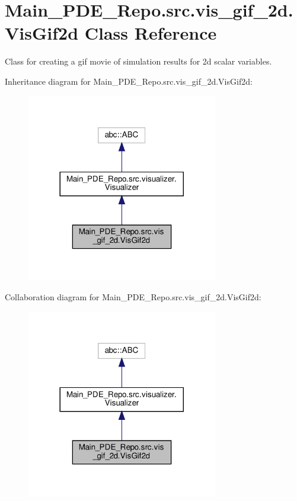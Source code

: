 \hypertarget{classMain__PDE__Repo_1_1src_1_1vis__gif__2d_1_1VisGif2d}{}\section{Main\+\_\+\+P\+D\+E\+\_\+\+Repo.\+src.\+vis\+\_\+gif\+\_\+2d.\+Vis\+Gif2d Class Reference}
\label{classMain__PDE__Repo_1_1src_1_1vis__gif__2d_1_1VisGif2d}


Class for creating a gif movie of simulation results for 2d scalar variables.  




Inheritance diagram for Main\+\_\+\+P\+D\+E\+\_\+\+Repo.\+src.\+vis\+\_\+gif\+\_\+2d.\+Vis\+Gif2d\+:
\nopagebreak
\begin{figure}[H]
\begin{center}
\leavevmode
\includegraphics[width=236pt]{classMain__PDE__Repo_1_1src_1_1vis__gif__2d_1_1VisGif2d__inherit__graph}
\end{center}
\end{figure}


Collaboration diagram for Main\+\_\+\+P\+D\+E\+\_\+\+Repo.\+src.\+vis\+\_\+gif\+\_\+2d.\+Vis\+Gif2d\+:
\nopagebreak
\begin{figure}[H]
\begin{center}
\leavevmode
\includegraphics[width=236pt]{classMain__PDE__Repo_1_1src_1_1vis__gif__2d_1_1VisGif2d__coll__graph}
\end{center}
\end{figure}
